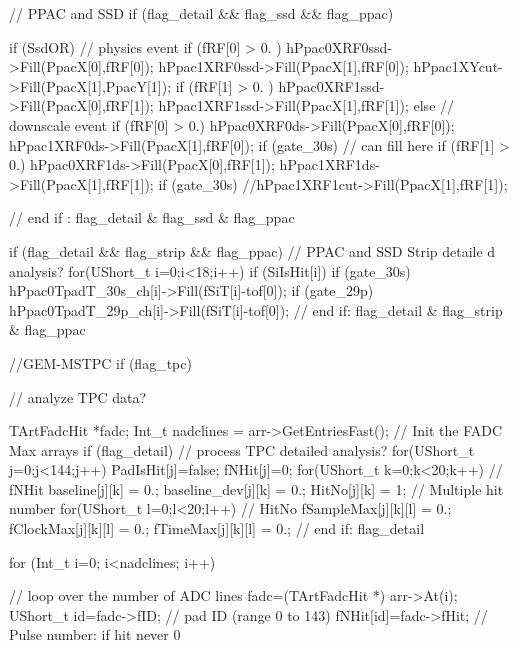 \begin{DoxyCode}
{{{{{{{{      // PPAC and SSD
      if (flag_detail && flag_ssd && flag_ppac){
        if (SsdOR){ // physics event
          if (fRF[0] > 0. ) {
            hPpac0XRF0ssd->Fill(PpacX[0],fRF[0]);
            hPpac1XRF0ssd->Fill(PpacX[1],fRF[0]);
            hPpac1XYcut->Fill(PpacX[1],PpacY[1]);
          }
          if (fRF[1] > 0. ) {
            hPpac0XRF1ssd->Fill(PpacX[0],fRF[1]);
            hPpac1XRF1ssd->Fill(PpacX[1],fRF[1]);
          }
        }
        else{ // downscale event
          if (fRF[0] > 0.){
            hPpac0XRF0ds->Fill(PpacX[0],fRF[0]);
            hPpac1XRF0ds->Fill(PpacX[1],fRF[0]);
            if (gate_30s){
            // can fill here
            }
          }
          if (fRF[1] > 0.){
            hPpac0XRF1ds->Fill(PpacX[0],fRF[1]);
            hPpac1XRF1ds->Fill(PpacX[1],fRF[1]);
            if (gate_30s){
              //hPpac1XRF1cut->Fill(PpacX[1],fRF[1]);
            }
          }
        }

      } // end if : flag_detail & flag_ssd & flag_ppac

      if (flag_detail && flag_strip && flag_ppac) { // PPAC and SSD Strip detaile
      d analysis?
        for(UShort_t i=0;i<18;i++){
            if (SiIsHit[i]){
              if (gate_30s)  hPpac0TpadT_30s_ch[i]->Fill(fSiT[i]-tof[0]);
              if (gate_29p) hPpac0TpadT_29p_ch[i]->Fill(fSiT[i]-tof[0]);
            }
        }
      } // end if: flag_detail & flag_strip & flag_ppac

      //GEM-MSTPC
      if (flag_tpc){  // analyze TPC data?
        
        TArtFadcHit *fadc;
        Int_t nadclines = arr->GetEntriesFast();
        // Init the FADC Max arrays
        if (flag_detail) { // process TPC detailed analysis? 
          for(UShort_t j=0;j<144;j++){
            PadIsHit[j]=false;
            fNHit[j]=0;  
            for(UShort_t k=0;k<20;k++){ // fNHit
              baseline[j][k] = 0.;
              baseline_dev[j][k] = 0.;
              HitNo[j][k] = 1; // Multiple hit number 
              for(UShort_t l=0;l<20;l++){ // HitNo
              fSampleMax[j][k][l] = 0.; 
              fClockMax[j][k][l] = 0.;
              fTimeMax[j][k][l] = 0.;
              }    
            }    
          }
        } // end if: flag_detail

        for (Int_t i=0; i<nadclines; i++) { // loop over the number of ADC lines
          fadc=(TArtFadcHit *) arr->At(i);
          UShort_t id=fadc->fID; // pad ID (range 0 to 143)
          fNHit[id]=fadc->fHit;  // Pulse number: if hit never 0
          
}}}}}}}}}}
\end{DoxyCode}
